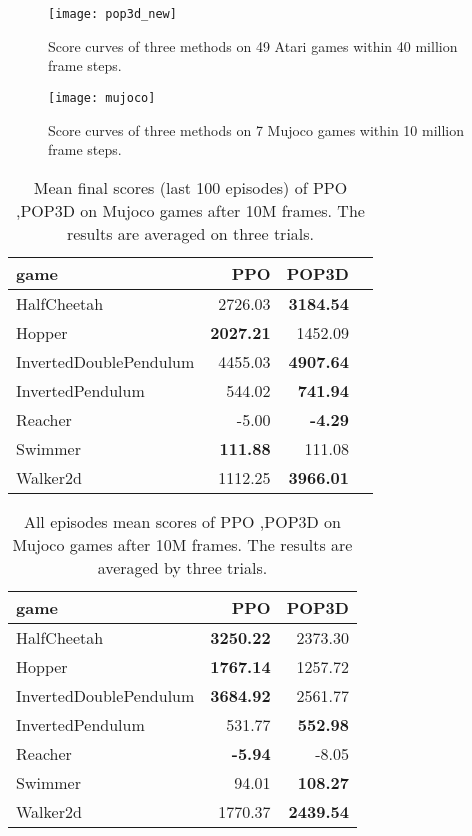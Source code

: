 \documentclass{article}
\begin{document}
\begin{figure*}
	\begin{center}
		\texttt{[image: pop3d\_new]}\caption{Score curves of three methods on 49 Atari games within 40 million frame steps.}
		\label{atari-fig}
	\end{center}
\end{figure*}




\begin{figure*}
	\begin{center}
		\texttt{[image: mujoco]}
		\caption{Score curves of three methods on 7 Mujoco games within 10 million frame steps.}
		\label{mujoco-fig}
	\end{center}
\end{figure*}

\begin{table*}
	\begin{center}
		\begin{tabular}{lrrr}
			\toprule
			game & PPO & POP3D  \\
			\midrule
			HalfCheetah & 2726.03 &\textbf{3184.54}  \\
			Hopper & \textbf{2027.21} &1452.09 \\
			InvertedDoublePendulum & 4455.03 &\textbf{4907.64}  \\
			InvertedPendulum & 544.02 &\textbf{741.94}  \\
			Reacher& -5.00 &\textbf{-4.29}  \\ 
			Swimmer & \textbf{111.88} &111.08  \\ 
			Walker2d & 1112.25 &\textbf{3966.01} \\ 
			\bottomrule
		\end{tabular}
	\end{center}
	\caption{Mean final scores (last 100 episodes) of PPO ,POP3D on Mujoco games after 10M  frames. The results are averaged on three trials.}
	\label{final_100_episodes_score_mujoco}
\end{table*}

\begin{table*}
	\begin{center}
		\begin{tabular}{lrr}
			\toprule
			game & PPO & POP3D\\
			\midrule
			HalfCheetah & \textbf{3250.22} &2373.30  \\
			Hopper & \textbf{1767.14} &1257.72  \\
			InvertedDoublePendulum & \textbf{3684.92} &2561.77  \\
			InvertedPendulum  & 531.77 &\textbf{552.98}  \\
			Reacher & \textbf{-5.94} &-8.05  \\
			Swimmer  & 94.01 &\textbf{108.27}  \\
			Walker2d  & 1770.37 &\textbf{2439.54}  \\
			\bottomrule
		\end{tabular}
	\end{center}
	\caption{All episodes mean scores of PPO ,POP3D on Mujoco games after 10M frames. The results are averaged by three trials.}
	\label{all-episodes-score-mujoco}
\end{table*}
\end{document}
